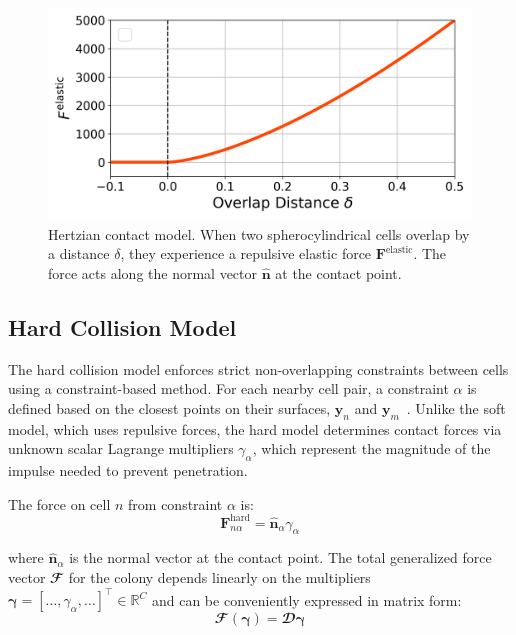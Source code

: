 \documentclass[conference]{IEEEtran}
\begin{document}
\begin{figure}[H]
    \centering
    \includegraphics[width=\linewidth]{figures/hertzian_contact_model.png}
    \caption{Hertzian contact model. When two spherocylindrical cells overlap by a distance $\delta$, they experience a repulsive elastic force $\mathbf{F}^{\text{elastic}}$. The force acts along the normal vector $\hat{\mathbf{n}}$ at the contact point.}
    \label{fig:hertzian_contact_model}
\end{figure}

\subsection{Hard Collision Model}

The hard collision model enforces strict non-overlapping constraints between cells using a constraint-based method. For each nearby cell pair, a constraint $\alpha$ is defined based on the closest points on their surfaces, $\mathbf{y}_n$ and $\mathbf{y}_m$~\cite{Weady2024SM}. Unlike the soft model, which uses repulsive forces, the hard model determines contact forces via unknown scalar Lagrange multipliers $\gamma_\alpha$, which represent the magnitude of the impulse needed to prevent penetration.

The force on cell $n$ from constraint $\alpha$ is:
\begin{equation} \label{eq:constraint_force}
    \mathbf{F}^{\text{hard}}_{n\alpha} = \hat{\mathbf{n}}_\alpha \gamma_\alpha
\end{equation}

where $\hat{\mathbf{n}}_\alpha$ is the normal vector at the contact point. The total generalized force vector $\mathbfcal{F}$ for the colony depends linearly on the multipliers $\boldsymbol{\gamma} = [\dots, \gamma_\alpha, \dots]^\top \in \mathbb{R}^{C}$ and can be conveniently expressed in matrix form:
\begin{equation} \label{eq:force_as_function_of_multipliers}
    \mathbfcal{F}(\boldsymbol{\gamma}) = \mathbfcal{D} \boldsymbol{\gamma}
\end{equation}
\end{document}
